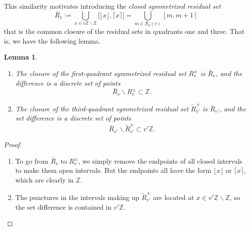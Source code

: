 \documentclass[12pt,letterpaper, reqno]{amsart}
\newtheorem{lem}[thm]{Lemma}
\theoremstyle{definition}
\theoremstyle{remark}
\newcommand{\ZZ}{\ensuremath{\mathbb{Z}}}
\newcommand{\vv}{{v'}}
\newcommand{\sB}{{\mathcal B}}
\newcommand{\floor}[1]{\lfloor{#1}\rfloor}
\newcommand{\ceil}[1]{\lceil{#1}\rceil}
\begin{document}
This similarity motivates introducing the {\em closed symmetrized residual set} 
\[ 
\bar{R}_v := \bigcup_{x\in v\ZZ \smallsetminus\ZZ} \big[ \floor{x},\ceil{x} \big] = \bigcup_{m\in \sB_0(v)} [m,m+1] 
\]
that is the common closure of the residual sets in quadrants one and three. That is, we have the following lemma.

\begin{lem}\label{closed-residue-set}
\begin{enumerate}
\item The closure of the first-quadrant symmetrized residual set $R_v^\pm$ is $\bar{R}_v$, and the difference
is a discrete set of points
\[ \bar{R}_v \smallsetminus R_v^\pm \subset \ZZ .\]
\item The closure of the third-quadrant symmetrized residual set $\widetilde{R}_{\vv}^\pm$ is $\bar{R}_{\vv}$, and the 
set difference is a discrete set of points
\[ \bar{R}_{\vv} \smallsetminus \widetilde{R}_{\vv}^\pm \subset \vv\ZZ . \]
\end{enumerate}
\end{lem}
\begin{proof}
\begin{enumerate}
\item To go from $\bar{R}_v$ to $R_v^\pm$, we simply remove the endpoints of all closed intervals to make them open intervals. 
But the endpoints all have the form $\floor{x}$ or $\ceil{x}$, which are clearly in $\ZZ$.

\item The punctures in the intervals making up $\widetilde{R}_{\vv}^\pm$ are located at $x\in \vv\ZZ\smallsetminus\ZZ$, 
so the set difference is contained in $\vv\ZZ$.
\end{enumerate}
\end{proof}
\end{document}
